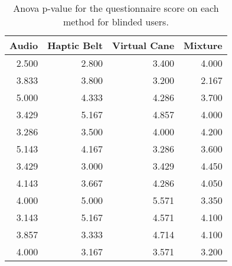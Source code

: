 
\begin{table}[!htb]
\centering
\caption{Anova p-value for the questionnaire score on each method for blinded users.}
\label{tab:anova_sagat}
\begin{tabular}{rrrr}
\toprule
 Audio &  Haptic Belt &  Virtual Cane &  Mixture \\
\midrule
 2.500 &        2.800 &         3.400 &    4.000 \\
 3.833 &        3.800 &         3.200 &    2.167 \\
 5.000 &        4.333 &         4.286 &    3.700 \\
 3.429 &        5.167 &         4.857 &    4.000 \\
 3.286 &        3.500 &         4.000 &    4.200 \\
 5.143 &        4.167 &         3.286 &    3.600 \\
 3.429 &        3.000 &         3.429 &    4.450 \\
 4.143 &        3.667 &         4.286 &    4.050 \\
 4.000 &        5.000 &         5.571 &    3.350 \\
 3.143 &        5.167 &         4.571 &    4.100 \\
 3.857 &        3.333 &         4.714 &    4.100 \\
 4.000 &        3.167 &         3.571 &    3.200 \\
\bottomrule
\end{tabular}
\end{table}


